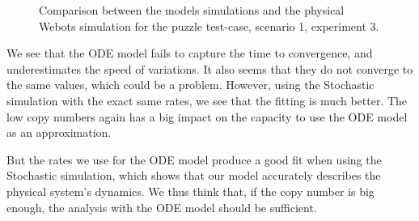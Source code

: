 		\begin{figure}[h!]
			\: %
			\caption{Comparison between the models simulations and the physical Webots simulation for the puzzle test-case, scenario 1, experiment 3.}
		\label{fig:models_comparison_experiment3} %
		\end{figure}
		
		We see that the ODE model fails to capture the time to convergence, and underestimates the speed of variations. It also seems that they do not converge to the same values, which could be a problem. However, using the Stochastic simulation with the exact same rates, we see that the fitting is much better. The low copy numbers again has a big impact on the capacity to use the ODE model as an approximation.
			
		But the rates we use for the ODE model produce a good fit when using the Stochastic simulation, which shows that our model accurately describes the physical system's dynamics. We thus think that, if the copy number is big enough, the analysis with the ODE model should be sufficient.
		

